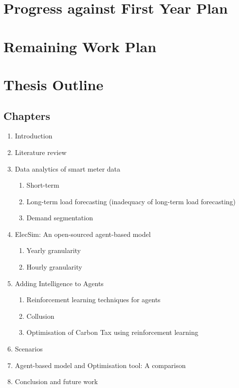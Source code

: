 \documentclass[12pt]{article}
\begin{document}
\section{Progress against First Year Plan}







\clearpage

\section{Remaining Work Plan}








\clearpage

\section{Thesis Outline}

\subsection{Chapters}
\begin{enumerate}

  \item Introduction
  \item Literature review
  \item Data analytics of smart meter data
  \begin{enumerate}
	  \item Short-term 
	  \item Long-term load forecasting (inadequacy of long-term load forecasting)
	  \item Demand segmentation
  \end{enumerate}
  \item ElecSim: An open-sourced agent-based model
    \begin{enumerate}
	  \item Yearly granularity
	  \item Hourly granularity
  \end{enumerate}
  \item Adding Intelligence to Agents
  \begin{enumerate}
	  \item Reinforcement learning techniques for agents
	  \item Collusion
	  \item Optimisation of Carbon Tax using reinforcement learning
  \end{enumerate}
  \item Scenarios
  \item Agent-based model and Optimisation tool: A comparison
  \item Conclusion and future work
  
\end{enumerate}
\end{document}
